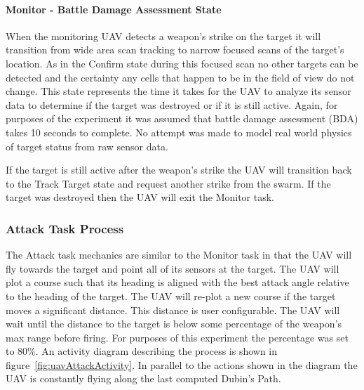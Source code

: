 \begin{multicols*}{2}
\paragraph{Monitor - Battle Damage Assessment State}
When the monitoring UAV detects a weapon's strike on the target it will transition from wide area scan tracking to narrow focused scans of the target's location.  As in the Confirm state during this focused scan no other targets can be detected and the certainty any cells that happen to be in the field of view do not change.  This state represents the time it takes for the UAV to analyze its sensor data to determine if the target was destroyed or if it is still active.  Again, for purposes of the experiment it was assumed that battle damage assessment (BDA) takes 10 seconds to complete.  No attempt was made to model real world physics of target status from raw sensor data.

If the target is still active after the weapon's strike the UAV will transition back to the Track Target state and request another strike from the swarm.  If the target was destroyed then the UAV will exit the Monitor task.


\subsubsection{Attack Task Process}
The Attack task mechanics are similar to the Monitor task in that the UAV will fly towards the target and point all of its sensors at the target.  The UAV will plot a course such that its heading is aligned with the best attack angle relative to the heading of the target.  The UAV will re-plot a new course if the target moves a significant distance.  This distance is user configurable.  The UAV will wait until the distance to the target is below some percentage of the weapon's max range before firing.  For purposes of this experiment the percentage was set to 80\%.  An activity diagram describing the process is shown in figure~\ref{fig:uavAttackActivity}.  In parallel to the actions shown in the diagram the UAV is constantly flying along the last computed Dubin's Path.


\end{multicols*}
